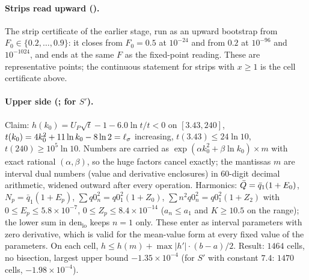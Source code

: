 \paragraph*{Strips read upward ().}
The strip certificate of the earlier stage, run as an upward bootstrap from $F_0\in\{0.2,\dots,0.9\}$: it closes from $F_0=0.5$ at $10^{-24}$ and
from $0.2$ at $10^{-96}$ and $10^{-1024}$, and ends at the same $F$ as the fixed-point reading. These are representative points; the continuous
statement for strips with $x\ge1$ is the cell certificate above.

\paragraph*{Upper side (;  for $S'$).}
Claim: $h(k_0)=U_P\sqrt{t}-1-6.0\ln t/t<0$ on $[3.43,240]$, $t(k_0)=4k_0^2+11\ln k_0-8\ln2=\ell_\sigma$ increasing, $t(3.43)\le24\ln10$,
$t(240)\ge10^5\ln10$. Numbers are carried as $\exp(\alpha k_0^2+\beta\ln k_0)\times m$ with exact rational $(\alpha,\beta)$, so the huge factors
cancel exactly; the mantissas $m$ are interval dual numbers (value and derivative enclosures) in $60$-digit decimal arithmetic, widened outward
after every operation. Harmonics: $\bar Q=\bar q_1(1+E_0)$, $N_p=\bar q_1(1+E_p)$, $\sum q0_n^2=q0_1^2(1+Z_0)$, $\sum n^2q0_n^2=q0_1^2(1+Z_2)$ with
$0\le E_p\le5.8\times10^{-7}$, $0\le Z_p\le8.4\times10^{-14}$ ($a_n\le a_1$ and $K\ge10.5$ on the range); the lower sum in $\mathrm{den}_{\mathrm{lo}}$
keeps $n=1$ only. These enter as interval parameters with zero derivative, which is valid for the mean-value form at every fixed value of the
parameters. On each cell, $h\le h(m)+\max|h'|\cdot(b-a)/2$. Result: $1464$ cells, no bisection, largest upper bound $-1.35\times10^{-4}$ (for $S'$
with constant $7.4$: $1470$ cells, $-1.98\times10^{-4}$).

